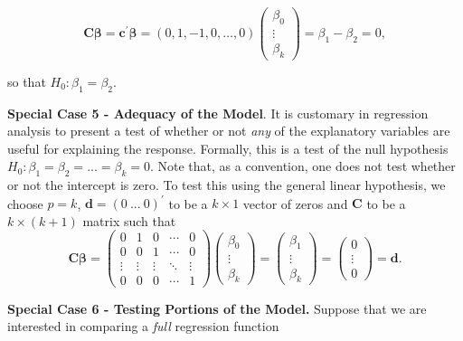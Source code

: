 \begin{equation*}
\mathbf{C \boldsymbol \beta = c^{\prime} \boldsymbol \beta}=
\left(0,1, -1, 0, \ldots, 0\right) \left(
\begin{array}{c}
\beta_0 \\
\vdots  \\
\beta_k
\end{array}
\right) =\beta_1 - \beta_2 = 0,
\end{equation*}

\noindent so that $H_0: \beta_1 = \beta_2.$


\textbf{Special Case 5 - Adequacy of the Model}. It is customary in
regression analysis to present a test of whether or not \emph{any}
of the explanatory variables are useful for explaining the response.
Formally, this is a test of the null hypothesis $H_0:\beta
_1=\beta_2=...=\beta_k=0$. Note that, as a convention, one does not
test whether or not the intercept
is zero. To test this using the general linear hypothesis, we choose $p=k$, $%
\mathbf{d=}\left( 0~...~0\right) ^{\prime }$ to be a $k\times 1$
vector of zeros and $\mathbf{C}$ to be a $k\times (k+1)$ matrix such
that
\begin{equation*}
\mathbf{C \boldsymbol \beta =}\left(
\begin{array}{ccccc}
0 & 1 & 0 & \cdots  & 0 \\
0 & 0 & 1 & \cdots  & 0 \\
\vdots  & \vdots  & \vdots  & \ddots  & \vdots  \\
0 & 0 & 0 & \cdots  & 1%
\end{array}%
\right) \left(
\begin{array}{c}
\beta_0 \\
\vdots  \\
\beta_k%
\end{array}%
\right) =\left(
\begin{array}{c}
\beta_1 \\
\vdots  \\
\beta_k%
\end{array}%
\right)  =\left(
\begin{array}{c}
0 \\
\vdots  \\
0
\end{array}%
\right) =\mathbf{d}.
\end{equation*}


\textbf{Special Case 6 - Testing Portions of the Model.} Suppose
that we are interested in comparing a \emph{full} regression
function

